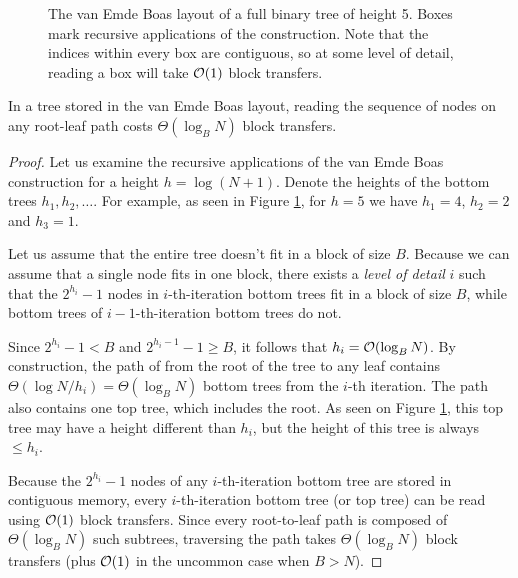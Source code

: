 \begin{figure}

\caption{The van Emde Boas layout of a full binary tree of height 5.
Boxes mark recursive applications of the construction. Note that the indices
within every box are contiguous, so at some level of detail, reading
a box will take $\mathcal{O}(1)$ block transfers.}
\label{fig:veb_layout_5}
\end{figure}

\begin{theorem}
In a tree stored in the van Emde Boas layout, reading the sequence of nodes
on any root-leaf path costs $\Theta(\log_B N)$ block transfers.
\end{theorem}

\begin{proof}
Let us examine the recursive applications of the van Emde Boas construction
for a height $h=\log (N+1)$. Denote the heights of the bottom trees
$h_1, h_2, \ldots$. For example, as seen in Figure \ref{fig:veb_layout_5}, for
$h=5$ we have $h_1=4$, $h_2=2$ and $h_3=1$.

Let us assume that the entire tree doesn't fit in a block of size $B$.
Because we can assume that a single node fits in one block, there exists a \textit{level of
detail} $i$ such that the $2^{h_i}-1$ nodes in $i$-th-iteration bottom trees
fit in a block of size $B$, while bottom trees of $i-1$-th-iteration bottom
trees do not.

Since $2^{h_i}-1 < B$ and $2^{h_i-1}-1 \geq B$, it follows that $h_i=\mathcal{O}(\log_B N)$.
By construction, the path of from the root of the tree to any leaf contains
$\Theta(\log N/h_i)=\Theta(\log_B N)$ bottom trees from the $i$-th iteration.
The path also contains one top tree, which includes the root.
As seen on Figure \ref{fig:veb_layout_5}, this top tree may have a height
different than $h_i$, but the height of this tree is always $\leq h_i$.

Because the $2^{h_i}-1$ nodes of any $i$-th-iteration bottom tree are stored
in contiguous memory, every $i$-th-iteration bottom tree (or top tree)
can be read using $\mathcal{O}(1)$ block transfers. Since every root-to-leaf path
is composed of $\Theta(\log_B N)$ such subtrees, traversing the path
takes $\Theta(\log_B N)$ block transfers (plus $\mathcal{O}(1)$ in the uncommon
case when $B > N$).
\end{proof}

